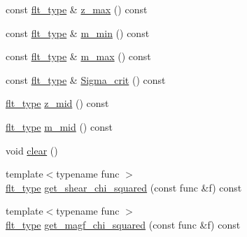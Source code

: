 \begin{DoxyCompactItemize}
\item 
const \hyperlink{lib_2IceBRG__main_2common_8h_ad0f130a56eeb944d9ef2692ee881ecc4}{flt\-\_\-type} \& \hyperlink{classlensing__fitting__bin_a6c564531cd0aa131b2e94216f9080b5b}{z\-\_\-max} () const 
\item 
const \hyperlink{lib_2IceBRG__main_2common_8h_ad0f130a56eeb944d9ef2692ee881ecc4}{flt\-\_\-type} \& \hyperlink{classlensing__fitting__bin_aad144b49db0b2b526de25177a1ab6278}{m\-\_\-min} () const 
\item 
const \hyperlink{lib_2IceBRG__main_2common_8h_ad0f130a56eeb944d9ef2692ee881ecc4}{flt\-\_\-type} \& \hyperlink{classlensing__fitting__bin_ad6a14402fa01167833af2aef5245a6c9}{m\-\_\-max} () const 
\item 
const \hyperlink{lib_2IceBRG__main_2common_8h_ad0f130a56eeb944d9ef2692ee881ecc4}{flt\-\_\-type} \& \hyperlink{classlensing__fitting__bin_aa1f8c8200ee999b406eb8c50734f7c16}{Sigma\-\_\-crit} () const 
\item 
\hyperlink{lib_2IceBRG__main_2common_8h_ad0f130a56eeb944d9ef2692ee881ecc4}{flt\-\_\-type} \hyperlink{classlensing__fitting__bin_a258e95543205304a21d50d711f4dafaf}{z\-\_\-mid} () const 
\item 
\hyperlink{lib_2IceBRG__main_2common_8h_ad0f130a56eeb944d9ef2692ee881ecc4}{flt\-\_\-type} \hyperlink{classlensing__fitting__bin_a1c95ea71a49ed1337fc7c032e851bd2d}{m\-\_\-mid} () const 
\item 
void \hyperlink{classlensing__fitting__bin_a68886acb64ab7612cbc22b8a79f17cf0}{clear} ()
\item 
{\footnotesize template$<$typename func $>$ }\\\hyperlink{lib_2IceBRG__main_2common_8h_ad0f130a56eeb944d9ef2692ee881ecc4}{flt\-\_\-type} \hyperlink{classlensing__fitting__bin_a6bc4ded478442146200420a9ac70c0db}{get\-\_\-shear\-\_\-chi\-\_\-squared} (const func \&f) const 
\item 
{\footnotesize template$<$typename func $>$ }\\\hyperlink{lib_2IceBRG__main_2common_8h_ad0f130a56eeb944d9ef2692ee881ecc4}{flt\-\_\-type} \hyperlink{classlensing__fitting__bin_ad185a642437c2104c4c5af328e33feaf}{get\-\_\-magf\-\_\-chi\-\_\-squared} (const func \&f) const 
\end{DoxyCompactItemize}


